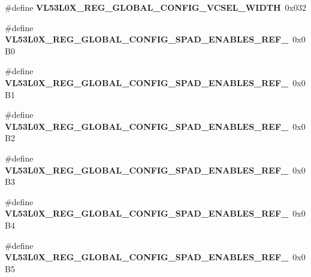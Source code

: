 \begin{DoxyCompactItemize}
\mbox{\label{group__VL53L0X__DefineRegisters__group_ga19471c4c7642e8d45f6854a0b6a8d293}} 
\#define {\bfseries V\+L53\+L0\+X\+\_\+\+R\+E\+G\+\_\+\+G\+L\+O\+B\+A\+L\+\_\+\+C\+O\+N\+F\+I\+G\+\_\+\+V\+C\+S\+E\+L\+\_\+\+W\+I\+D\+TH}~0x032
\item 
\mbox{\label{group__VL53L0X__DefineRegisters__group_gad9811277b4d8490b3baeb564ad8e1795}} 
\#define {\bfseries V\+L53\+L0\+X\+\_\+\+R\+E\+G\+\_\+\+G\+L\+O\+B\+A\+L\+\_\+\+C\+O\+N\+F\+I\+G\+\_\+\+S\+P\+A\+D\+\_\+\+E\+N\+A\+B\+L\+E\+S\+\_\+\+R\+E\+F\+\_}~0x0\+B0
\item 
\mbox{\label{group__VL53L0X__DefineRegisters__group_gaf4243ac59852d4297877137459a7ed8b}} 
\#define {\bfseries V\+L53\+L0\+X\+\_\+\+R\+E\+G\+\_\+\+G\+L\+O\+B\+A\+L\+\_\+\+C\+O\+N\+F\+I\+G\+\_\+\+S\+P\+A\+D\+\_\+\+E\+N\+A\+B\+L\+E\+S\+\_\+\+R\+E\+F\+\_}~0x0\+B1
\item 
\mbox{\label{group__VL53L0X__DefineRegisters__group_ga734c7ac624d3946cec2c83caa8f1cde6}} 
\#define {\bfseries V\+L53\+L0\+X\+\_\+\+R\+E\+G\+\_\+\+G\+L\+O\+B\+A\+L\+\_\+\+C\+O\+N\+F\+I\+G\+\_\+\+S\+P\+A\+D\+\_\+\+E\+N\+A\+B\+L\+E\+S\+\_\+\+R\+E\+F\+\_}~0x0\+B2
\item 
\mbox{\label{group__VL53L0X__DefineRegisters__group_ga980b3f796938b9a45340ad6636d00031}} 
\#define {\bfseries V\+L53\+L0\+X\+\_\+\+R\+E\+G\+\_\+\+G\+L\+O\+B\+A\+L\+\_\+\+C\+O\+N\+F\+I\+G\+\_\+\+S\+P\+A\+D\+\_\+\+E\+N\+A\+B\+L\+E\+S\+\_\+\+R\+E\+F\+\_}~0x0\+B3
\item 
\mbox{\label{group__VL53L0X__DefineRegisters__group_gad4f31261d881c4b2ae63fc5db2ff1b01}} 
\#define {\bfseries V\+L53\+L0\+X\+\_\+\+R\+E\+G\+\_\+\+G\+L\+O\+B\+A\+L\+\_\+\+C\+O\+N\+F\+I\+G\+\_\+\+S\+P\+A\+D\+\_\+\+E\+N\+A\+B\+L\+E\+S\+\_\+\+R\+E\+F\+\_}~0x0\+B4
\item 
\mbox{\label{group__VL53L0X__DefineRegisters__group_gafe4045671f5579c52300edd37f3b877c}} 
\#define {\bfseries V\+L53\+L0\+X\+\_\+\+R\+E\+G\+\_\+\+G\+L\+O\+B\+A\+L\+\_\+\+C\+O\+N\+F\+I\+G\+\_\+\+S\+P\+A\+D\+\_\+\+E\+N\+A\+B\+L\+E\+S\+\_\+\+R\+E\+F\+\_}~0x0\+B5

\end{DoxyCompactItemize}
